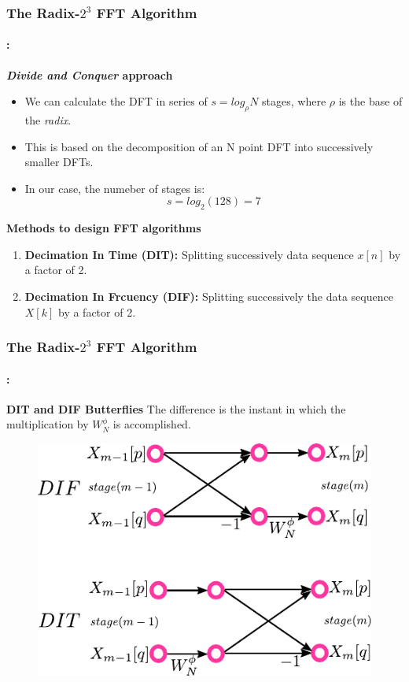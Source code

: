 \begin{frame}
  	\frametitle{\textbf{The Radix-$2^3$ FFT  Algorithm}}
	\framesubtitle{\secname : \subsecname}
	\begin{block}{\centering \textbf{\textit{Divide and Conquer} approach}}
		\begin{itemize} %
			\item We can calculate the DFT in series of $s=log_\rho N$ stages, where $\rho$ is the base of the \textit{radix}. 
			\item This is based on the decomposition of an N point DFT into successively smaller DFTs.
			\item  In our case, the numeber of stages is:
		 	\begin{equation}
		 			s = log_2 (128) = 7 
		 	\end{equation}
		\end{itemize}		
	\end{block}

	\begin{block}{\centering \textbf{Methods to design FFT algorithms}}
		\begin{enumerate}
			\item \textbf{Decimation In Time (DIT):} Splitting successively data sequence $x[n]$ by a factor of 2. 					
			\item \textbf{Decimation In Frcuency (DIF):} Splitting successively the data sequence $X[k]$ by a factor of 2. 
		\end{enumerate}											
  	\end{block}
\end{frame}

\begin{frame}
  	\frametitle{\textbf{The Radix-$2^3$ FFT  Algorithm}}
	\framesubtitle{\secname : \subsecname}
	\begin{block}{\centering \textbf{DIT and DIF Butterflies}}
		The difference is the instant in which the multiplication by $W_N^\phi$ is accomplished. 
	\end{block}    	
    	\vspace{-0.2cm}
    	\begin{figure}[h!] \centering
    		\includegraphics[width=0.45\paperwidth]{./image/DifDit.pdf}
    	\end{figure}
\end{frame}

